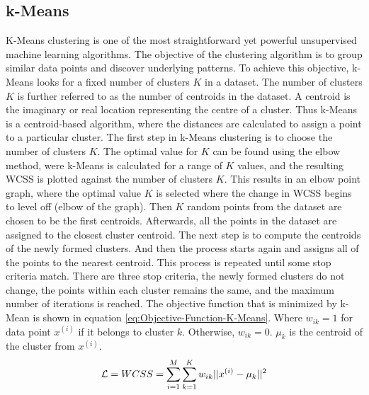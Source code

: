 \subsection{k-Means}
\label{sub:K-Means}
K-Means clustering is one of the most straightforward yet powerful unsupervised machine learning algorithms. The objective of the clustering algorithm is to group similar data points and discover underlying patterns. To achieve this objective, k-Means looks for a fixed number of clusters $K$ in a dataset. The number of clusters $K$ is further referred to as the number of centroids in the dataset. A centroid is the imaginary or real location representing the centre of a cluster. Thus k-Means is a centroid-based algorithm, where the distances are calculated to assign a point to a particular cluster.
\newline
\newline
The first step in k-Means clustering is to choose the number of clusters $K$. The optimal value for $K$ can be found using the elbow method, were k-Means is calculated for a range of $K$ values, and the resulting \gls{WCSS} is plotted against the number of clusters $K$. This results in an elbow point graph, where the optimal value $K$ is selected where the change in \gls{WCSS} begins to level off (elbow of the graph). Then $K$ random points from the dataset are chosen to be the first centroids. Afterwards, all the points in the dataset are assigned to the closest cluster centroid. The next step is to compute the centroids of the newly formed clusters. And then the process starts again and assigns all of the points to the nearest centroid. This process is repeated until some stop criteria match. There are three stop criteria, the newly formed clusters do not change, the points within each cluster remains the same, and the maximum number of iterations is reached. The objective function that is minimized by k-Mean is shown in equation \ref{eq:Objective-Function-K-Means}. Where $w_{ik} = 1$ for data point $x^{(i)}$ if it belongs to cluster $k$. Otherwise, $w_{ik} = 0$. $\mu_k$ is the centroid of the cluster from $x^{(i)}$.
\begin{equation}
    \centering
    \begin{gathered}
        \mathcal{L} = WCSS = \sum_{i=1}^M\sum_{k=1}^K w_{ik} || x^{(i)} - \mu_k ||^2
    \end{gathered}
    \label{eq:Objective-Function-K-Means}
\end{equation}

